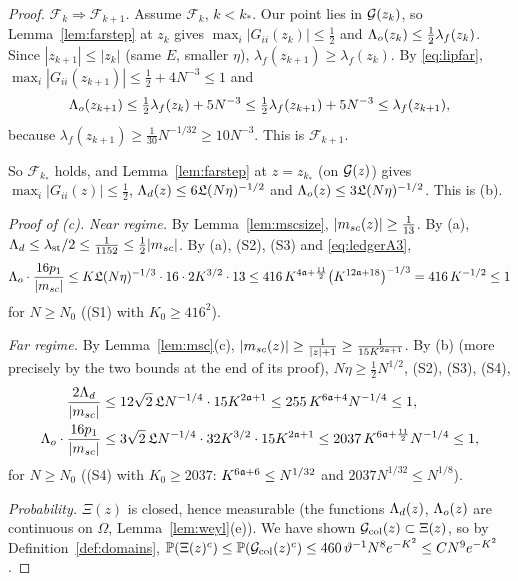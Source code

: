 \begin{proof}
\emph{$\mathcal F_k\Rightarrow\mathcal F_{k+1}$.} Assume $\mathcal F_k$, $k<k_*$. Our point lies in $\mathcal{G}(z_k)$, so Lemma~\ref{lem:farstep} at $z_k$ gives $\max_i|G_{ii}(z_k)|\le\frac12$ and $\Lambda_o(z_k)\le\frac12\lambda_f(z_k)$. Since $|z_{k+1}|\le|z_k|$ (same $E$, smaller $\eta$), $\lambda_f(z_{k+1})\ge\lambda_f(z_k)$.
By \eqref{eq:lipfar}, $\max_i|G_{ii}(z_{k+1})|\le\frac12+4N^{-3}\le1$ and
\[
 \Lambda_o(z_{k+1})\le\tfrac12\lambda_f(z_k)+5N^{-3}\le\tfrac12\lambda_f(z_{k+1})+5N^{-3}\le\lambda_f(z_{k+1}),
\]
because $\lambda_f(z_{k+1})\ge\frac1{30}N^{-1/32}\ge10N^{-3}$. This is $\mathcal F_{k+1}$.

So $\mathcal F_{k_*}$ holds, and Lemma~\ref{lem:farstep} at $z=z_{k_*}$ (on $\mathcal{G}(z)$) gives $\max_i|G_{ii}(z)|\le\frac12$, $\Lambda_d(z)\le6\mathfrak{L}(N\eta)^{-1/2}$ and $\Lambda_o(z)\le3\mathfrak{L}(N\eta)^{-1/2}$. This is (b).

\medskip\emph{Proof of \textup{(c)}.} \emph{Near regime.} By Lemma~\ref{lem:mscsize}, $|m_{sc}(z)|\ge\frac1{13}$. By (a), $\Lambda_d\le\lambda_{\rm st}/2\le\frac1{1152}\le\frac12|m_{sc}|$. By (a), (S2), (S3) and \eqref{eq:ledgerA3},
\[
 \Lambda_o\cdot\frac{16p_1}{|m_{sc}|}\le K\mathfrak{L}(N\eta)^{-1/3}\cdot16\cdot2K^{3/2}\cdot13\le416\,K^{4\mathfrak{a}+\frac{11}2}\big(K^{12\mathfrak{a}+18}\big)^{-1/3}=416\,K^{-1/2}\le1
\]
for $N\ge N_0$ ((S1) with $K_0\ge416^2$).

\emph{Far regime.} By Lemma~\ref{lem:msc}(c), $|m_{sc}(z)|\ge\frac1{|z|+1}\ge\frac1{15K^{2\mathfrak{a}+1}}$. By (b) (more precisely by the two bounds at the end of its proof), $N\eta\ge\frac12N^{1/2}$, (S2), (S3), (S4),
\begin{align*}
 \frac{2\Lambda_d}{|m_{sc}|}&\le12\sqrt2\,\mathfrak{L} N^{-1/4}\cdot15K^{2\mathfrak{a}+1}\le255\,K^{6\mathfrak{a}+4}N^{-1/4}\le1,\\
 \Lambda_o\cdot\frac{16p_1}{|m_{sc}|}&\le3\sqrt2\,\mathfrak{L} N^{-1/4}\cdot32K^{3/2}\cdot15K^{2\mathfrak{a}+1}\le2037\,K^{6\mathfrak{a}+\frac{11}2}N^{-1/4}\le1,
\end{align*}
for $N\ge N_0$ ((S4) with $K_0\ge2037$: $K^{6\mathfrak{a}+6}\le N^{1/32}$ and $2037N^{1/32}\le N^{1/8}$).

\emph{Probability.} $\Xi(z)$ is closed, hence measurable (the functions $\Lambda_d(z)$, $\Lambda_o(z)$ are continuous on $\Omega$, Lemma~\ref{lem:weyl}(e)). We have shown $\mathcal{G}_{\rm col}(z)\subset\Xi(z)$, so by Definition~\ref{def:domains},
$\mathbb{P}(\Xi(z)^c)\le\mathbb{P}(\mathcal{G}_{\rm col}(z)^c)\le460\,\vartheta^{-1}N^8e^{-K^2}\le CN^9e^{-K^2}$.
\end{proof}

